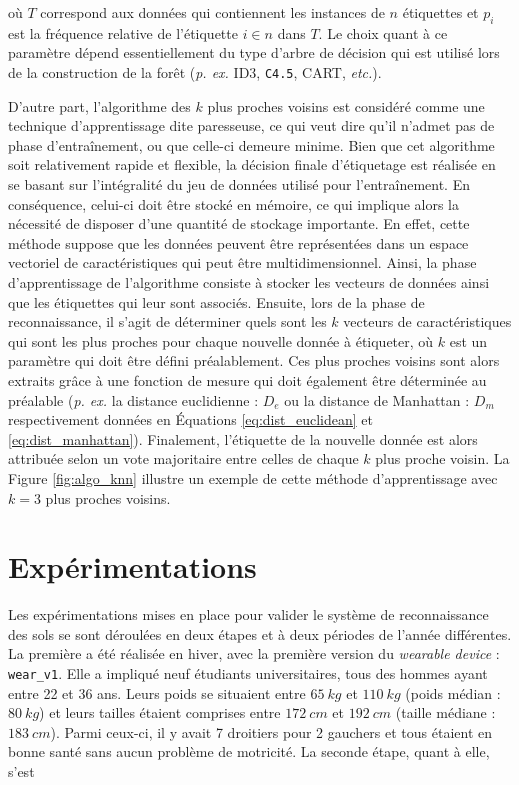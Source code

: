 \noindent où $T$ correspond aux données qui contiennent les instances de $n$ étiquettes et $p_i$ est la fréquence relative de l'étiquette $i \in n$ dans $T$. Le choix quant à ce paramètre dépend essentiellement du type d'arbre de décision qui est utilisé lors de la construction de la forêt (\textit{p. ex.} ID3, \texttt{C4.5}, CART, \textit{etc.}).

D'autre part, l'algorithme des $k$ plus proches voisins est considéré comme une technique d'apprentissage dite \og{}paresseuse\fg{}, ce qui veut dire qu'il n'admet pas de phase d'entraînement, ou que celle-ci demeure minime. Bien que cet algorithme soit relativement rapide et flexible, la décision finale d'étiquetage est réalisée en se basant sur l'intégralité du jeu de données utilisé pour l'entraînement. En conséquence, celui-ci doit être stocké en mémoire, ce qui implique alors la nécessité de disposer d'une quantité de stockage importante. En effet, cette méthode suppose que les données peuvent être représentées dans un espace vectoriel de caractéristiques qui peut être multidimensionnel. Ainsi, la phase d'apprentissage de l'algorithme consiste à stocker les vecteurs de données ainsi que les étiquettes qui leur sont associés. Ensuite, lors de la phase de reconnaissance, il s'agit de déterminer quels sont les $k$ vecteurs de caractéristiques qui sont les plus proches pour chaque nouvelle donnée à étiqueter, où $k$ est un paramètre qui doit être défini préalablement. Ces plus proches voisins sont alors extraits grâce à une fonction de mesure qui doit également être déterminée au préalable (\textit{p. ex.} la distance euclidienne : $D_e$ ou la distance de Manhattan : $D_m$ respectivement données en Équations \ref{eq:dist_euclidean} et \ref{eq:dist_manhattan}). Finalement, l'étiquette de la nouvelle donnée est alors attribuée selon un vote majoritaire entre celles de chaque $k$ plus proche voisin. La Figure \ref{fig:algo_knn} illustre un exemple de cette méthode d'apprentissage avec $k=3$ plus proches voisins.

\section{Expérimentations}
\label{sec:expe}

Les expérimentations mises en place pour valider le système de reconnaissance des sols se sont déroulées en deux étapes et à deux périodes de l'année différentes. La première a été réalisée en hiver, avec la première version du \textit{wearable device} : \texttt{wear\_v1}. Elle a impliqué neuf étudiants universitaires, tous des hommes ayant entre 22 et 36 ans. Leurs poids se situaient entre $65\:kg$ et $110\:kg$ (poids médian : $80\:kg$) et leurs tailles étaient comprises entre $172\:cm$ et $192\:cm$ (taille médiane : $183\:cm$). Parmi ceux-ci, il y avait 7 droitiers pour 2 gauchers et tous étaient en bonne santé sans aucun problème de motricité. La seconde étape, quant à elle, s'est

